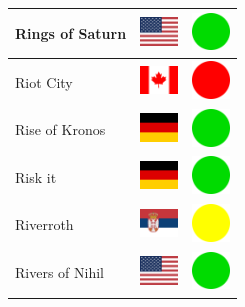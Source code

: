 \documentclass[12pt, a4paper, twoside]{report}
\begin{document}
\begin{center}
\begin{longtable}{|p{5cm}|p{2cm}|p{2cm}|}
 Rings of Saturn                                            & \includegraphics[width=1cm]{../img/flags/us} &   \includegraphics[width=1cm]{../likes/y} \\ \hline
 Riot City                                                  & \includegraphics[width=1cm]{../img/flags/ca} &   \includegraphics[width=1cm]{../likes/n} \\ \hline
 Rise of Kronos                                             & \includegraphics[width=1cm]{../img/flags/de} &   \includegraphics[width=1cm]{../likes/y} \\ \hline
 Risk it                                                    & \includegraphics[width=1cm]{../img/flags/de} &   \includegraphics[width=1cm]{../likes/y} \\ \hline
 Riverroth                                                  & \includegraphics[width=1cm]{../img/flags/rs} &   \includegraphics[width=1cm]{../likes/m} \\ \hline
 Rivers of Nihil                                            & \includegraphics[width=1cm]{../img/flags/us} &   \includegraphics[width=1cm]{../likes/y} \\ \hline

\end{longtable}
\end{center}
\end{document}
